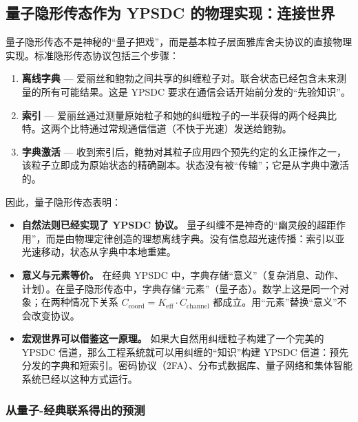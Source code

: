 \documentclass[12pt,a4paper]{article}
\theoremstyle{remark}
\begin{document}
	\subsection{量子隐形传态作为 YPSDC 的物理实现：连接世界}
	
	量子隐形传态不是神秘的“量子把戏”，而是基本粒子层面雅库舍夫协议的直接物理实现。标准隐形传态协议包括三个步骤：
	
	\begin{enumerate}
		\item \textbf{离线字典} — 爱丽丝和鲍勃之间共享的纠缠粒子对。联合状态已经包含未来测量的所有可能结果。这是 YPSDC 要求在通信会话开始前分发的“先验知识”。
		\item \textbf{索引} — 爱丽丝通过测量原始粒子和她的纠缠粒子的一半获得的两个经典比特。这两个比特通过常规通信信道（不快于光速）发送给鲍勃。
		\item \textbf{字典激活} — 收到索引后，鲍勃对其粒子应用四个预先约定的幺正操作之一，该粒子立即成为原始状态的精确副本。状态没有被“传输”；它是从字典中激活的。
	\end{enumerate}
	
	因此，量子隐形传态表明：
	
	\begin{itemize}
		\item \textbf{自然法则已经实现了 YPSDC 协议。} 量子纠缠不是神奇的“幽灵般的超距作用”，而是由物理定律创造的理想离线字典。没有信息超光速传播：索引以亚光速移动，状态从字典中本地重建。
		\item \textbf{意义与元素等价。} 在经典 YPSDC 中，字典存储“意义”（复杂消息、动作、计划）。在量子隐形传态中，字典存储“元素”（量子态）。数学上这是同一个对象；在两种情况下关系 \( C_{\mathrm{coord}} = K_{\mathrm{eff}} \cdot C_{\mathrm{channel}} \) 都成立。用“元素”替换“意义”不会改变协议。
		\item \textbf{宏观世界可以借鉴这一原理。} 如果大自然用纠缠粒子构建了一个完美的 YPSDC 信道，那么工程系统就可以用纠缠的“知识”构建 YPSDC 信道：预先分发的字典和短索引。密码协议（2FA）、分布式数据库、量子网络和集体智能系统已经以这种方式运行。
	\end{itemize}
	
	\subsubsection*{从量子-经典联系得出的预测}
	
\end{document}

